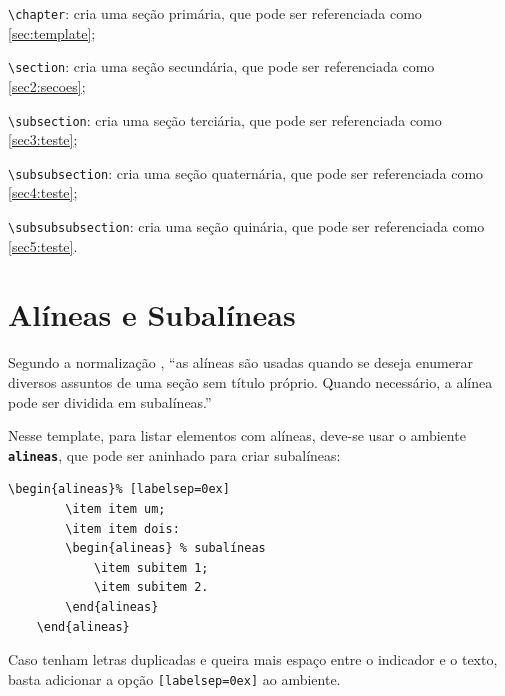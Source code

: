 \begin{alineas}
	\item \verb|\chapter|:  cria uma seção primária, que pode ser referenciada como \autoref{sec:template};
	\item \verb|\section|:  cria uma seção secundária, que pode ser referenciada como \autoref{sec2:secoes};
	\item \verb|\subsection|:  cria uma seção terciária, que pode ser referenciada como \autoref{sec3:teste};
	\item \verb|\subsubsection|:  cria uma seção quaternária, que pode ser referenciada como \autoref{sec4:teste};
	\item \verb|\subsubsubsection|:  cria uma seção quinária, que pode ser referenciada como \autoref{sec5:teste}.
\end{alineas}


\section{Alíneas e Subalíneas}
Segundo a normalização \cite{UFLA:2025}, ``as alíneas são usadas quando se deseja enumerar diversos assuntos de uma seção sem título próprio. Quando necessário, a alínea pode ser dividida em subalíneas.''

Nesse template, para listar elementos com alíneas, deve-se usar o ambiente \textbf{\texttt{alineas}}, que pode ser aninhado para criar subalíneas: 
\begin{lstlisting}[language={[LaTeX]TeX}]
	\begin{alineas}% [labelsep=0ex]
		\item item um;
		\item item dois:
		\begin{alineas} % subalíneas
			\item subitem 1;
			\item subitem 2.
		\end{alineas}
	\end{alineas}
\end{lstlisting}
Caso tenham letras duplicadas e queira mais espaço entre o indicador e o texto, basta adicionar a opção \texttt{[labelsep=0ex]} ao ambiente.


